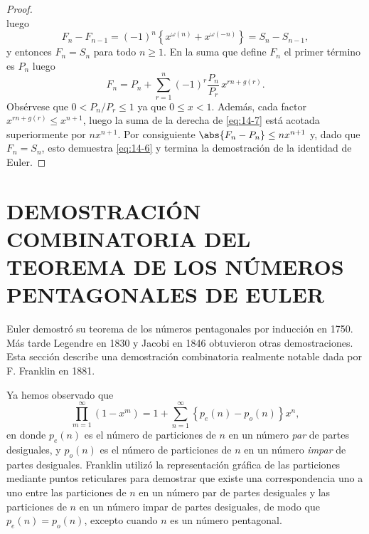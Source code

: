 \begin{proof}
\begin{equation*}
        \end{equation*}
        luego
        \begin{equation*}
            F_n-F_{n-1}=(-1)^n\left\{x^{\omega(n)}+x^{\omega(-n)}\right\}=S_n-S_{n-1},
        \end{equation*}
        y entonces $F_n=S_n$ para todo $n\geq1$. En la suma que define $F_n$ el primer término
        es $P_n$ luego
        \begin{equation}\label{eq:14-7}
            F_n=P_n+\sum_{r=1}^{n}(-1)^r\frac{P_n}{P_r}\,x^{rn+g(r)}.
        \end{equation}
        Obsérvese que $0<P_n/P_r\leq1$ ya que $0\leq x<1$. Además, cada factor
        $x^{rn+g(r)}\leq x^{n+1}$, luego la suma de la derecha de \eqref{eq:14-7} está acotada
        superiormente por $nx^{n+1}$. Por consiguiente $\abs{F_n-P_n}\leq nx^{n+1}$ y, dado que
        $F_n=S_n$, esto demuestra \eqref{eq:14-6} y termina la demostración de la identidad de
        Euler.
    \end{proof}

    \section{DEMOSTRACIÓN COMBINATORIA DEL TEOREMA DE LOS NÚMEROS PENTAGONALES DE EULER}

    Euler demostró su teorema de los números pentagonales por inducción en 1750. Más tarde
    Legendre en 1830 y Jacobi en 1846 obtuvieron otras demostraciones. Esta sección describe
    una demostración combinatoria realmente notable dada por F. Franklin \cite{franklin1881} en
    1881.

    Ya hemos observado que
    \begin{equation*}
        \prod_{m=1}^{\infty}(1-x^m)=1+\sum_{n=1}^{\infty}\left\{p_e(n)-p_o(n)\right\}x^n,
    \end{equation*}
    en donde $p_e(n)$ es el número de particiones de $n$ en un número \textit{par} de partes
    desiguales, y $p_o(n)$ es el número de particiones de $n$ en un número \textit{impar} de
    partes desiguales. Franklin utilizó la representación gráfica de las particiones mediante
    puntos reticulares para demostrar que existe una correspondencia uno a uno entre las
    particiones de $n$ en un número par de partes desiguales y las particiones de $n$ en un
    número impar de partes desiguales, de modo que $p_e(n)=p_o(n)$, excepto cuando $n$ es un
    número pentagonal.

